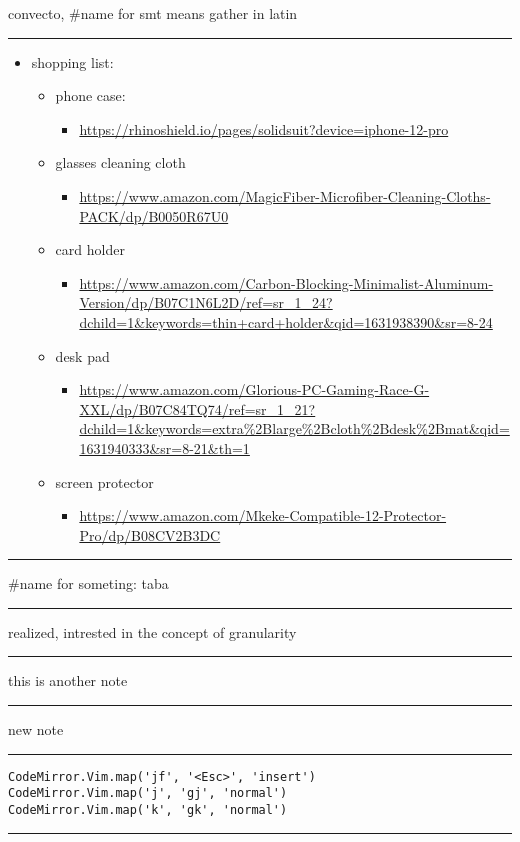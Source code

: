\documentclass[letterpaper]{article}
\begin{document}
convecto, \#name for smt means gather in latin

\noindent\rule{\textwidth}{0.5pt}

\begin{itemize}
\item shopping list:
\begin{itemize}
\item phone case:
\begin{itemize}
\item \url{https://rhinoshield.io/pages/solidsuit?device=iphone-12-pro}
\end{itemize}
\item glasses cleaning cloth
\begin{itemize}
\item \url{https://www.amazon.com/MagicFiber-Microfiber-Cleaning-Cloths-PACK/dp/B0050R67U0}
\end{itemize}
\item card holder
\begin{itemize}
\item \url{https://www.amazon.com/Carbon-Blocking-Minimalist-Aluminum-Version/dp/B07C1N6L2D/ref=sr\_1\_24?dchild=1\&keywords=thin+card+holder\&qid=1631938390\&sr=8-24}
\end{itemize}
\item desk pad
\begin{itemize}
\item \url{https://www.amazon.com/Glorious-PC-Gaming-Race-G-XXL/dp/B07C84TQ74/ref=sr\_1\_21?dchild=1\&keywords=extra\%2Blarge\%2Bcloth\%2Bdesk\%2Bmat\&qid=1631940333\&sr=8-21\&th=1}
\end{itemize}
\item screen protector
\begin{itemize}
\item \url{https://www.amazon.com/Mkeke-Compatible-12-Protector-Pro/dp/B08CV2B3DC}
\end{itemize}
\end{itemize}
\end{itemize}

\noindent\rule{\textwidth}{0.5pt}

\#name for someting: taba

\noindent\rule{\textwidth}{0.5pt}

realized, intrested in the concept of granularity

\noindent\rule{\textwidth}{0.5pt}

this is another note

\noindent\rule{\textwidth}{0.5pt}

new note

\noindent\rule{\textwidth}{0.5pt}

\begin{verbatim}
CodeMirror.Vim.map('jf', '<Esc>', 'insert')
CodeMirror.Vim.map('j', 'gj', 'normal')
CodeMirror.Vim.map('k', 'gk', 'normal')
\end{verbatim}

\noindent\rule{\textwidth}{0.5pt}
\end{document}
